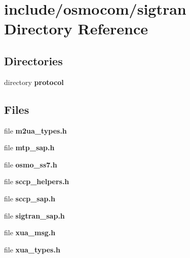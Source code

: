 \section{include/osmocom/sigtran Directory Reference}
\label{dir_85348e37fbd25790b99e135735251b13}
\subsection*{Directories}
\begin{DoxyCompactItemize}
\item 
directory {\bf protocol}
\end{DoxyCompactItemize}
\subsection*{Files}
\begin{DoxyCompactItemize}
\item 
file {\bf m2ua\+\_\+types.\+h}
\item 
file {\bf mtp\+\_\+sap.\+h}
\item 
file {\bf osmo\+\_\+ss7.\+h}
\item 
file {\bf sccp\+\_\+helpers.\+h}
\item 
file {\bf sccp\+\_\+sap.\+h}
\item 
file {\bf sigtran\+\_\+sap.\+h}
\item 
file {\bf xua\+\_\+msg.\+h}
\item 
file {\bf xua\+\_\+types.\+h}
\end{DoxyCompactItemize}

